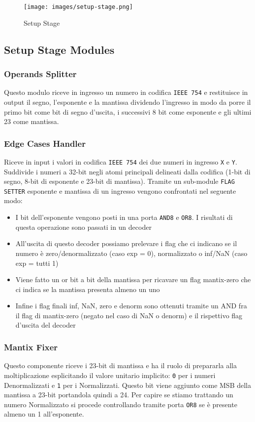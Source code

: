 \documentclass[twoside,11pt]{article}
\begin{document}
{\begin{figure}[h!]
    \centering
    \texttt{[image: images/setup-stage.png]}
    \caption{Setup Stage}
    \label{fig:setup-stage}
\end{figure}

\subsection{Setup Stage Modules}
\subsubsection{Operands Splitter}
Questo modulo riceve in ingresso un numero in codifica \verb|IEEE 754| e restituisce in output il segno, l’esponente e la mantissa dividendo l’ingresso in modo da porre il primo bit come bit di segno d’uscita, i successivi 8 bit come esponente e gli ultimi 23 come mantissa.

\subsubsection{Edge Cases Handler}
Riceve in input i valori in codifica \verb|IEEE 754| dei due numeri in ingresso \verb|X| e \verb|Y|.
Suddivide i numeri a 32-bit negli atomi principali delineati dalla codifica (1-bit di segno, 8-bit di esponente e 23-bit di mantissa). Tramite un sub-module \verb|FLAG SETTER| esponente e mantissa di un ingresso vengono confrontati nel seguente modo:
\begin{itemize}[noitemsep]
    \item I bit dell’esponente vengono posti in una porta \verb|AND8| e \verb|OR8|. I risultati di questa operazione sono passati in un decoder
    \item All’uscita di questo decoder possiamo prelevare i flag che ci indicano se il numero è zero/denormalizzato (caso exp = 0), normalizzato o inf/NaN (caso exp = tutti 1)
    \item Viene fatto un or bit a bit della mantissa per ricavare un flag mantix-zero che ci indica se la mantissa presenta almeno un uno
    \item Infine i flag finali inf, NaN, zero e denorm sono ottenuti tramite un AND fra il flag di mantix-zero (negato nel caso di NaN o denorm) e il rispettivo flag d’uscita del decoder
\end{itemize}

\subsubsection{Mantix Fixer}
Questo componente riceve i 23-bit di mantissa e ha il ruolo di prepararla alla moltiplicazione esplicitando il valore unitario implicito: \verb|0| per i numeri Denormalizzati e \verb|1| per i Normalizzati.
Questo bit viene aggiunto come MSB della mantissa a 23-bit portandola quindi a 24.
Per capire se stiamo trattando un numero Normalizzato si procede controllando tramite porta \verb|OR8| se è presente almeno un 1 all'esponente.

}
\end{document}
